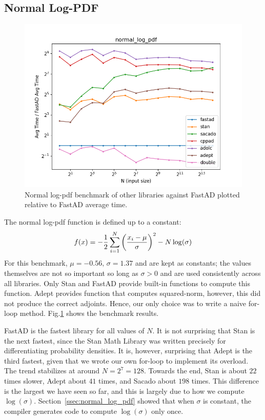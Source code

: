 \subsection{Normal Log-PDF}

\begin{figure}[t]
    \centering
    \includegraphics[width=\textwidth]{figs/normal_log_pdf_fig.png}
    \caption{%
        Normal log-pdf benchmark of other libraries against FastAD 
        plotted relative to FastAD average time.
    }\label{fig:normal_log_pdf}
\end{figure}

The normal log-pdf function is defined up to a constant:
\[
    f(x) = -\frac{1}{2} \sum\limits_{i=1}^N \left(\frac{x_i - \mu}{\sigma}\right)^2 
           -N\log(\sigma)
\]
For this benchmark, $\mu = -0.56,\,\sigma = 1.37$ and are kept as constants;
the values themselves are not so important so long as $\sigma > 0$
and are used consistently across all libraries.
Only Stan and FastAD provide built-in functions to compute this function.
Adept provides  function that computes squared-norm,
however, this did not produce the correct adjoints.
Hence, our only choice was to write a naive for-loop method.
Fig.\ref{fig:normal_log_pdf} shows the benchmark results.

FastAD is the fastest library for all values of $N$.
It is not surprising that Stan is the next fastest, 
since the Stan Math Library was written precisely for differentiating probability densities.
It is, however, surprising that Adept is the third fastest,
given that we wrote our own for-loop to implement its overload.
The trend stabilizes at around $N=2^{7}=128$.
Towards the end,
Stan is about $ 22$ times slower,
Adept about $ 41$ times,
and Sacado about $ 198$ times.
This difference is the largest we have seen so far,
and this is largely due to how we compute $\log(\sigma)$.
Section~\ref{ssec:normal_log_pdf} showed that when $\sigma$ is constant,
the compiler generates code to compute $\log(\sigma)$ only once.
